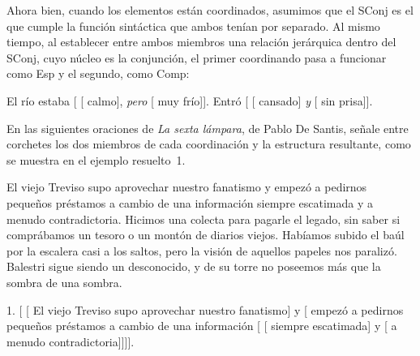 Ahora bien, cuando los elementos están coordinados, asumimos que el SConj es el
que cumple la función sintáctica que ambos tenían por separado. Al mismo tiempo,
al establecer entre ambos miembros una relación jerárquica dentro del SConj, cuyo
núcleo es la conjunción, el primer coordinando pasa a funcionar como Esp y el
segundo, como Comp:

\begin{exe}
  \ex
    \begin{xlist}
      \ex El río estaba [ [ calmo],
          \textit{pero} [ muy frío]].
      \ex Entró [ [ cansado] \textit{y}
          [ sin prisa]].
    \end{xlist}
\end{exe}

\begin{ejercicio}\label{ej:12-desantis}
En las siguientes oraciones de \textit{La sexta lámpara}, de Pablo De Santis,
señale entre corchetes los dos miembros de cada coordinación y la estructura
resultante, como se muestra en el ejemplo resuelto~1.

\begin{exe}
  \ex El viejo Treviso supo aprovechar nuestro fanatismo y empezó a pedirnos
      pequeños préstamos a cambio de una información siempre escatimada y a
      menudo contradictoria.
  \ex Hicimos una colecta para pagarle el legado, sin saber si comprábamos un
      tesoro o un montón de diarios viejos.
  \ex Habíamos subido el baúl por la escalera casi a los saltos, pero la visión
      de aquellos papeles nos paralizó.
  \ex Balestri sigue siendo un desconocido, y de su torre no poseemos más que la
      sombra de una sombra.
\end{exe}

\begin{resuelto}
1. [ [ El viejo Treviso supo aprovechar nuestro
fanatismo] y [ empezó a pedirnos pequeños préstamos a
cambio de una información [ [ siempre
escatimada] y [ a menudo contradictoria]]]].
\end{resuelto}
\end{ejercicio}

